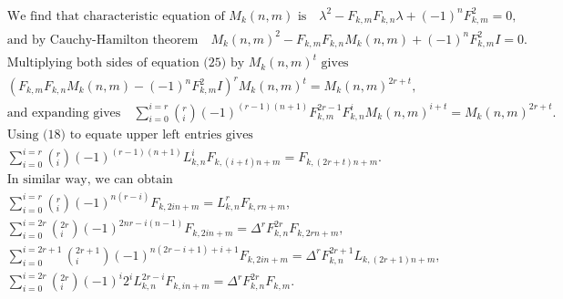 \begin{align*}	
&\text{We find that characteristic equation of $M_{k}(n,m)$ is}\quad
	\lambda^2-F_{k,m}F_{k,n}\lambda+(-1)^nF_{k,m}^2=0,\\	
	&\text{and by Cauchy-Hamilton theorem}\quad
	M_{k}(n,m)^2-F_{k,m}F_{k,n}M_{k}(n,m)+(-1)^nF_{k,m}^2I=0.\\
	&\text{Multiplying both sides of equation (25) by $M_{k}(n,m)^{t}$ gives}\\
&(F_{k,m}F_{k,n}M_{k}(n,m)-(-1)^nF_{k,m}^2I)^rM_{k}(n,m)^t
	=M_{k}(n,m)^{2r+t},\\
 &\text{and expanding gives} 
	\quad\sum_{i=0}^{i=r}\left(^{r} _{i} \right)(-1)^{(r-1)(n+1)}F_{k,m}^{2r-1}F_{k,n}^{i}M_{k}(n,m)^{i+t}=M_{k}(n,m)^{2r+t}.\\	
&\text{Using (18) to equate upper left entries gives}\\
&\sum_{i=0}^{i=r}\left(^{r} _{i} \right)(-1)^{(r-1)(n+1)}L_{k,n}^{i}F_{k,(i+t)n+m}=F_{k,(2r+t)n+m}.\\	
&\text{In similar way, we can obtain}\\
&\sum_{i=0}^{i=r}\left(^{r} _{i} \right)(-1)^{n(r-i)}F_{k,2in+m}=L_{k,n}^rF_{k,rn+m},\\
	&\sum_{i=0}^{i=2r}\left(^{2r} _{i} \right)(-1)^{2nr-i(n-1)}F_{k,2in+m}=\Delta^rF_{k,n}^{2r}F_{k,2rn+m},\\	
&\sum_{i=0}^{i=2r+1}\left(^{2r+1} _{i} \right)(-1)^{n(2r-i+1)+i+1}F_{k,2in+m}= \Delta^rF_{k,n}^{2r+1}L_{k,(2r+1)n+m},\\
&\sum_{i=0}^{i=2r}\left(^{2r} _{i} \right)(-1)^{i}2^iL_{k,n}^{2r-i}F_{k,in+m}=\Delta^rF_{k,n}^{2r}F_{k,m}.
\end{align*}	
